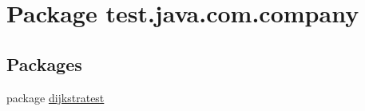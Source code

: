 \hypertarget{namespacetest_1_1java_1_1com_1_1company}{\section{Package test.\-java.\-com.\-company}
\label{namespacetest_1_1java_1_1com_1_1company}
}
\subsection*{Packages}
\begin{DoxyCompactItemize}
\item 
package \hyperlink{namespacetest_1_1java_1_1com_1_1company_1_1dijkstratest}{dijkstratest}
\end{DoxyCompactItemize}
